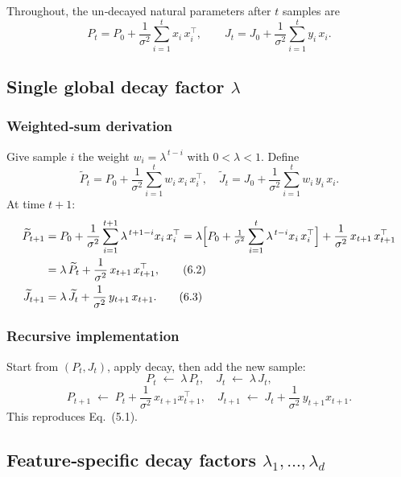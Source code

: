 \documentclass[11pt]{article}
\begin{document}
Throughout, the un‐decayed natural parameters after $t$ samples are
\begin{equation}\tag{6.0}
P_t = P_0 + \frac{1}{\sigma^2}\sum_{i=1}^t x_i\,x_i^\top,
\qquad
J_t = J_0 + \frac{1}{\sigma^2}\sum_{i=1}^t y_i\,x_i.
\end{equation}

\subsection{Single global decay factor \(\lambda\)}

\subsubsection{Weighted‐sum derivation}

Give sample \(i\) the weight \(w_i = \lambda^{\,t-i}\) with \(0<\lambda<1\).  Define
\begin{equation}\tag{6.1}
\widetilde P_t
= P_0 + \frac{1}{\sigma^2}\sum_{i=1}^t w_i\,x_i\,x_i^\top,
\quad
\widetilde J_t
= J_0 + \frac{1}{\sigma^2}\sum_{i=1}^t w_i\,y_i\,x_i.
\end{equation}
At time \(t+1\):
\begin{align}
\widetilde P_{t+1}
&= P_0 + \frac{1}{\sigma^2}\sum_{i=1}^{t+1}\lambda^{\,t+1-i}x_i\,x_i^\top
= \lambda\Bigl[P_0 + \tfrac{1}{\sigma^2}\sum_{i=1}^t\lambda^{\,t-i}x_i\,x_i^\top\Bigr]
  + \frac{1}{\sigma^2}\,x_{t+1}\,x_{t+1}^\top\notag\\
&= \lambda\,\widetilde P_t + \frac{1}{\sigma^2}\,x_{t+1}\,x_{t+1}^\top,
\tag{6.2}\\
\widetilde J_{t+1}
&= \lambda\,\widetilde J_t + \frac{1}{\sigma^2}\,y_{t+1}\,x_{t+1}.
\tag{6.3}
\end{align}

\subsubsection{Recursive implementation}

Start from \((P_t,J_t)\), apply decay, then add the new sample:
\[
P_t \;\leftarrow\;\lambda\,P_t,\quad
J_t \;\leftarrow\;\lambda\,J_t,
\]
\[
P_{t+1}\;\leftarrow\;P_t + \frac{1}{\sigma^2}\,x_{t+1}x_{t+1}^\top,
\quad
J_{t+1}\;\leftarrow\;J_t + \frac{1}{\sigma^2}\,y_{t+1}x_{t+1}.
\]
This reproduces Eq.~(5.1).

\subsection{Feature‐specific decay factors \(\lambda_1,\dots,\lambda_d\)}
\end{document}
